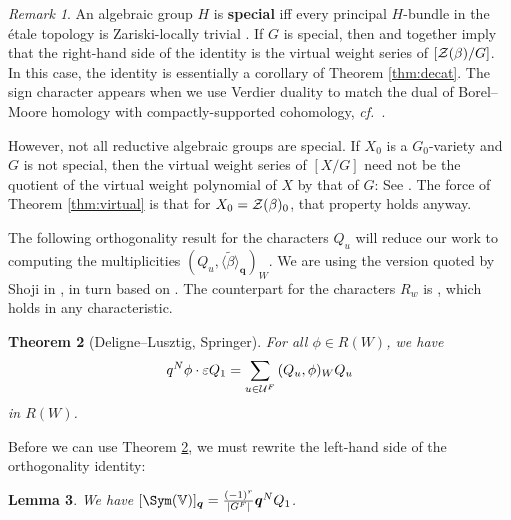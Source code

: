 \documentclass[a4paper,10pt,leqno]{amsart}
\theoremstyle{plain}
\theoremstyle{plain}
\newtheorem{thm}{Theorem}[subsection]
\theoremstyle{plain}
\newtheorem{lem}[thm]{Lemma}
\theoremstyle{definition}
\theoremstyle{remark}
\newtheorem{rem}[thm]{Remark}
\newcommand{\dfemph}[1]{\textbf{#1}}
\newcommand{\Q}{\bm{q}}
\newcommand{\Tr}[1]{\langle{#1}\rangle_{\Q}}
\begin{document}
\begin{rem}\label{rem:special}
An algebraic group $H$ is \dfemph{special} iff every principal $H$-bundle in the \'etale topology is Zariski-locally trivial \cite{grothendieck_1958}.
If $G$ is special, then \cite[Appendix]{hr} and \cite[Thm.\ 4.10]{joyce} together imply that the right-hand side of the identity is the virtual weight series of $[\cal{Z}(\beta)/G]$.
In this case, the identity is essentially a corollary of Theorem \ref{thm:decat}.
The sign character appears when we use Verdier duality to match the dual of Borel--Moore homology with compactly-supported cohomology, \emph{cf.}\ \cite[Lem.\ 4.5]{ahjr}.

However, not all reductive algebraic groups are special.
If $X_0$ is a $G_0$-variety and $G$ is not special, then the virtual weight series of $[X/G]$ need not be the quotient of the virtual weight polynomial of $X$ by that of $G$:
See \cite[Ex.\ 4.9]{joyce}.
The force of Theorem \ref{thm:virtual} is that for $X_0 = \cal{Z}(\beta)_0$, that property holds anyway.
\end{rem}

The following orthogonality result for the characters $Q_u$ will reduce our work to computing the multiplicities $(Q_u, \Tr{\tilde{\beta}})_W$.
We are using the version quoted by Shoji in \cite[510]{shoji}, in turn based on \cite[Thm.\ 5.6]{springer_1976}.
The counterpart for the characters $R_w$ is \cite[Thm.\ 6.9]{dl}, which holds in any characteristic.

\begin{thm}[Deligne--Lusztig, Springer]\label{thm:orthogonality}
For all $\phi \in R(W)$, we have
\begin{align}
q^N \phi \cdot \varepsilon Q_1 
= 
\sum_{u \in \cal{U}^F}
{(Q_u, \phi)_W} Q_u
\end{align}
in $R(W)$.
\end{thm}

Before we can use Theorem \ref{thm:orthogonality}, we must rewrite the left-hand side of the orthogonality identity:

\begin{lem}\label{lem:q1}
We have $[\Sym(\bb{V})]_{\Q} = \frac{(-1)^r}{|G^F|} \Q^N Q_1$.
\end{lem}
\end{document}
